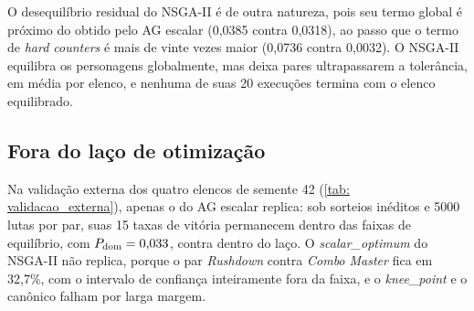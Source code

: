 O desequilíbrio residual do NSGA-II é de outra natureza, pois seu termo global é próximo do obtido pelo AG escalar (0,0385 contra 0,0318), ao passo que o termo de \textit{hard counters} é mais de vinte vezes maior (0,0736 contra 0,0032). O NSGA-II equilibra os personagens globalmente, mas deixa pares ultrapassarem a tolerância, em média \hcNSGAmedia{} por elenco, e nenhuma de suas 20 execuções termina com o elenco equilibrado.

\subsection{Fora do laço de otimização}
\label{sub: res_validacao_externa}

Na validação externa dos quatro elencos de semente 42 (\autoref{tab: validacao_externa}), apenas o do AG escalar replica: sob sorteios inéditos e 5000 lutas por par, suas 15 taxas de vitória permanecem dentro das faixas de equilíbrio, com $P_{\mathrm{dom}} = 0{,}033{}$, contra \extDomLacoAG{} dentro do laço. O \textit{scalar\_optimum} do NSGA-II não replica, porque o par \textit{Rushdown} contra \textit{Combo Master} fica em 32,7\%, com o intervalo de confiança inteiramente fora da faixa, e o \textit{knee\_point} e o canônico falham por larga margem.

